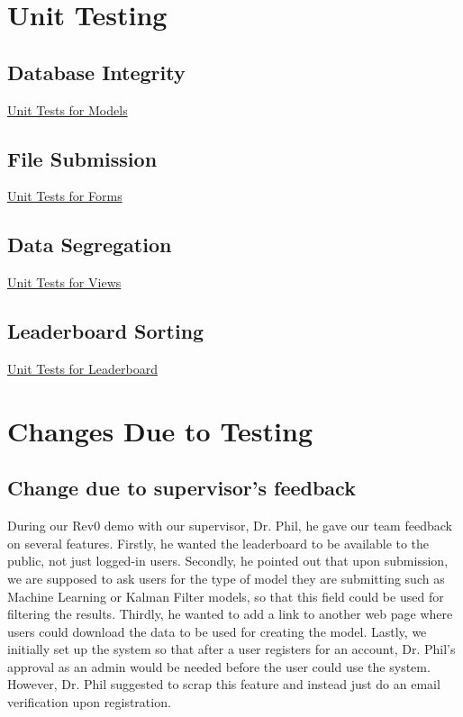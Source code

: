 \documentclass[12pt, titlepage]{article}
\begin{document}
\section{Unit Testing}
\subsection{Database Integrity}
\href{https://github.com/AidanMariglia/SOCAlgoTestPlatform/blob/main/src/webserver/webserver/submissions/tests.py}{Unit Tests for Models}

\subsection{File Submission}
\href{https://github.com/AidanMariglia/SOCAlgoTestPlatform/blob/main/src/webserver/webserver/submissions/tests.py}{Unit Tests for Forms}

\subsection{Data Segregation}
\href{https://github.com/AidanMariglia/SOCAlgoTestPlatform/blob/main/src/webserver/webserver/submissions/tests.py}{Unit Tests for Views}

\subsection{Leaderboard Sorting}
\href{https://github.com/AidanMariglia/SOCAlgoTestPlatform/blob/main/src/webserver/webserver/leaderboard/tests.py}{Unit Tests for Leaderboard}

\section{Changes Due to Testing}

\subsection{Change due to supervisor's feedback}
During our Rev0 demo with our supervisor, Dr. Phil, he gave our team feedback on several features. Firstly, he wanted the leaderboard to be available to the public, not just logged-in users. Secondly, he pointed out that upon submission, we are supposed to ask users for the type of model they are submitting such as Machine Learning or Kalman Filter models, so that this field could be used for filtering the results. Thirdly, he wanted to add a link to another web page where users could download the data to be used for creating the model. Lastly, we initially set up the system so that after a user registers for an account, Dr. Phil's approval as an admin would be needed before the user could use the system. However, Dr. Phil suggested to scrap this feature and instead just do an email verification upon registration.
\end{document}

